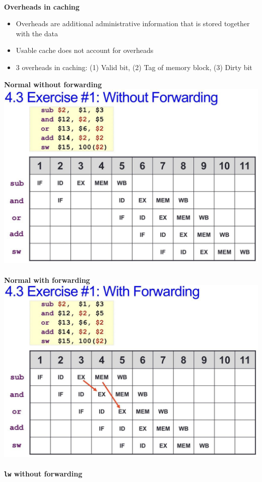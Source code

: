 \documentclass[a4paper]{article} \usepackage[backend=biber, style=numeric, sorting=none]{biblatex}
\begin{document}
\begin{multicols*}{4}
\textbf{{\\Overheads in caching}}
\begin{itemize}
\item Overheads are additional administrative information that is stored together with the data
\item Usable cache does not account for overheads
\item 3 overheads in caching: (1) Valid bit, (2) Tag of memory block, (3) Dirty bit
\end{itemize}

\vfill\null
\columnbreak
\textbf{Normal without forwarding\\}
\includegraphics[width=0.90\columnwidth]{normal_without_forwarding.jpg}
\textbf{\\\\Normal with forwarding\\}
\includegraphics[width=0.90\columnwidth]{normal_with_forwarding.jpg}
\textbf{\texttt{\\\\lw} without forwarding\\}

\end{multicols*}
\end{document}
